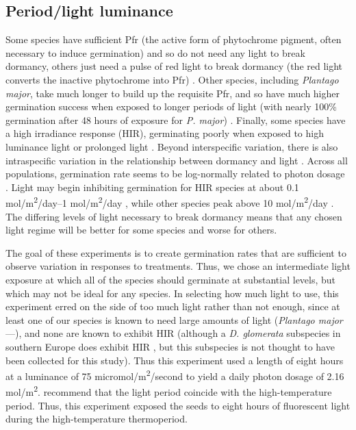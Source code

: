 \documentclass[12pt]{article}\usepackage[]{graphicx}\usepackage[]{color}
\begin{document}
\subsection{Period/light luminance}
Some species have sufficient Pfr (the active form of phytochrome pigment, often necessary to induce germination) and so do not need any light to break dormancy, others just need a pulse of red light to break dormancy (the red light converts the inactive phytochrome into Pfr) \parencite{Casal998}.  Other species, including \textit{Plantago major}, take much longer to build up the requisite Pfr, and so have much higher germination success when exposed to longer periods of light (with nearly 100\% germination after 48 hours of exposure for \textit{P. major}) \parencite{Pons1991}. Finally, some species have a high irradiance response (HIR), germinating poorly when exposed to high luminance light or prolonged light \parencite{Roberts1987}. Beyond interspecific variation, there is also intraspecific variation in the relationship between dormancy and light \parencite{Probert1986}. Across all populations, germination rate seems to be log-normally related to photon dosage \parencite{Ellis1986}. Light may begin inhibiting germination for HIR species at about 0.1 mol/m\textsuperscript{2}/day--1 mol/m\textsuperscript{2}/day \parencite{Baskin1998,Ellis1986}, while other species peak above 10 mol/m\textsuperscript{2}/day \parencite{Ellis1986}. The differing levels of light necessary to break dormancy means that any chosen light regime will be better for some species and worse for others. 
	
	The goal of these experiments is to create germination rates that are sufficient to observe variation in responses to treatments. Thus, we chose an intermediate light exposure at which all of the species should germinate at substantial levels, but which may not be ideal for any species. In selecting how much light to use, this experiment erred on the side of too much light rather than not enough, since at least one of our species is known to need large amounts of light (\textit{Plantago major}---\textcite{Pons1991}), and none are known to exhibit HIR (although a \textit{D. glomerata} subspecies in southern Europe does exhibit HIR \parencite{Probert1986}, but this subspecies is not thought to have been collected for this study). Thus this experiment used a length of eight hours at a luminance of 75 micromol/m\textsuperscript{2}/second to yield a daily photon dosage of 2.16 mol/m\textsuperscript{2}. \textcite{Baskin1998} recommend that the light period coincide with the high-temperature period. Thus, this experiment exposed the seeds to eight hours of fluorescent light during the high-temperature thermoperiod. 
	
\end{document}

